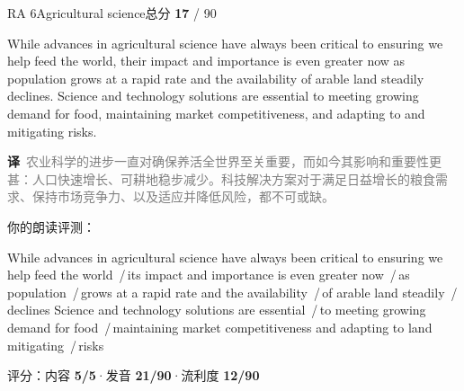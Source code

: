 \documentclass[11pt]{article}
\newcommand{\sfull}[1]{\textcolor{cFix}{\bfseries #1}}     %
\newcommand{\spart}[1]{\textcolor{cPartial}{\bfseries #1}} %
\newcommand{\szero}[1]{\textcolor{cWrong}{\bfseries #1}}   %
\newcommand{\sg}[1]{\textcolor{cSpkGood}{#1}}   %
\newcommand{\sy}[1]{\textcolor{cSpkOk}{#1}}     %
\newcommand{\pse}{{\color{gray}\,/\,}}          %
\newcommand{\zh}[1]{{\footnotesize\textcolor{cNote}{\textbf{译}}\ \textcolor{gray}{#1}}}
\begin{document}
\begin{qblock}{RA 6\quad Agricultural science}{总分 \textcolor{cAccent}{\bfseries 17} / 90}
\begin{promptbox}
While advances in agricultural science have always been critical to ensuring we help feed the world, their impact and importance is even greater now as population grows at a rapid rate and the availability of arable land steadily declines. Science and technology solutions are essential to meeting growing demand for food, maintaining market competitiveness, and adapting to and mitigating risks.
\end{promptbox}
\zh{农业科学的进步一直对确保养活全世界至关重要，而如今其影响和重要性更甚：人口快速增长、可耕地稳步减少。科技解决方案对于满足日益增长的粮食需求、保持市场竞争力、以及适应并降低风险，都不可或缺。}
\smallskip\par{\footnotesize\color{gray}你的朗读评测：}
\begin{asrbox}
\sg{While} \sy{advances} \sg{in agricultural science have always been critical to} \sg{ensuring we help feed the world} \pse \sg{its impact and importance is even} \sy{greater now} \pse \sy{as population} \pse \sy{grows at} \sg{a rapid rate and the availability} \pse \sy{of arable land steadily} \pse \sg{declines Science and technology solutions are} \sy{essential} \pse \sg{to meeting growing demand for} \sy{food} \pse \sy{maintaining market competitiveness and adapting to land mitigating} \pse \sg{risks}
\end{asrbox}
{\small 评分：内容 \sfull{5/5}\quad·\quad 发音 \spart{21/90}\quad·\quad 流利度 \szero{12/90}}
\end{qblock}
\end{document}
